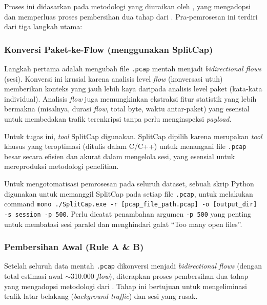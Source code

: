 Proses ini didasarkan pada metodologi yang diuraikan oleh \citep{park2024fast}, yang mengadopsi dan memperluas proses pembersihan dua tahap dari \citep{baek2023preprocessing}. Pra-pemrosesan ini terdiri dari tiga langkah utama:

\subsubsection{Konversi Paket-ke-Flow (menggunakan SplitCap)}
Langkah pertama adalah mengubah file \texttt{.pcap} mentah menjadi \textit{bidirectional flows} (sesi). Konversi ini krusial karena analisis level \textit{flow} (konversasi utuh) memberikan konteks yang jauh lebih kaya daripada analisis level paket (kata-kata individual). Analisis \textit{flow} juga memungkinkan ekstraksi fitur statistik yang lebih bermakna (misalnya, durasi \textit{flow}, total byte, waktu antar-paket) yang esensial untuk membedakan trafik terenkripsi tanpa perlu menginspeksi \textit{payload}.

Untuk tugas ini, \textit{tool} SplitCap digunakan. SplitCap dipilih karena merupakan \textit{tool} khusus yang teroptimasi (ditulis dalam C/C++) untuk menangani file \texttt{.pcap} besar secara efisien dan akurat dalam mengelola sesi, yang esensial untuk mereproduksi metodologi penelitian.

Untuk mengotomatisasi pemrosesan pada seluruh dataset, sebuah skrip Python digunakan untuk memanggil SplitCap pada setiap file \texttt{.pcap}, untuk melakukan command \texttt{mono ./SplitCap.exe -r [pcap\_file\_path.pcap] -o [output\_dir] -s session -p 500}. Perlu dicatat penambahan argumen \texttt{-p 500} yang penting untuk membatasi sesi paralel dan menghindari galat ``Too many open files''.

\subsubsection{Pembersihan Awal (Rule A \& B)}
Setelah seluruh data mentah \texttt{.pcap} dikonversi menjadi \textit{bidirectional flows} (dengan total estimasi awal $\sim$310.000 \textit{flow}), diterapkan proses pembersihan dua tahap yang mengadopsi metodologi dari \citep{baek2023preprocessing}. Tahap ini bertujuan untuk mengeliminasi trafik latar belakang (\textit{background traffic}) dan sesi yang rusak.

